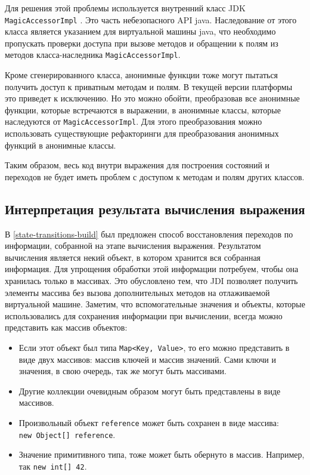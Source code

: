 Для решения этой проблемы используется внутренний класс JDK \\ \texttt{MagicAccessorImpl} \cite{magic}. Это часть небезопасного API java. Наследование от этого класса является указанием для виртуальной машины java, что необходимо пропускать проверки доступа при вызове методов и обращении к полям из методов класса-наследника \texttt{MagicAccessorImpl}.

Кроме сгенерированного класса, анонимные функции тоже могут пытаться получить доступ к приватным методам и полям. В текущей версии платформы это приведет к исключению. Но это можно обойти, преобразовав все анонимные функции, которые встречаются в выражении, в анонимные классы, которые наследуются от \texttt{MagicAccessorImpl}. Для этого преобразования можно использовать существующие рефакторинги для преобразования анонимных функций в анонимные классы.

Таким образом, весь код внутри выражения для построения состояний и переходов не будет иметь проблем с доступом к методам и полям других классов.

\subsection{Интерпретация результата вычисления выражения}  \label{impl:interpter}
В \ref{state-transitions-build} был предложен способ восстановления переходов по информации, собранной на этапе вычисления выражения. Результатом вычисления является некий объект, в котором хранится вся собранная информация. Для упрощения обработки этой информации потребуем, чтобы она хранилась только в массивах. Это обусловлено тем, что JDI позволяет получить элементы массива без вызова дополнительных методов на отлаживаемой виртуальной машине. Заметим, что вспомогательные значения и объекты, которые использовались для сохранения информации при вычислении, всегда можно представить как массив объектов:
\begin{itemize}
	\item Если этот объект был типа \texttt{Map<Key, Value>}, то его можно представить в виде двух массивов: массив ключей и массив значений. Сами ключи и значения, в свою очередь, так же могут быть массивами.
	\item Другие коллекции очевидным образом могут быть представлены в виде массивов.
	\item Произвольный объект \texttt{reference} может быть сохранен в виде массива: \\ \texttt{new Object[] {reference}}.
	\item Значение примитивного типа, тоже может быть обернуто в массив. Например, так \texttt{new int[] {42}}.
\end{itemize}

